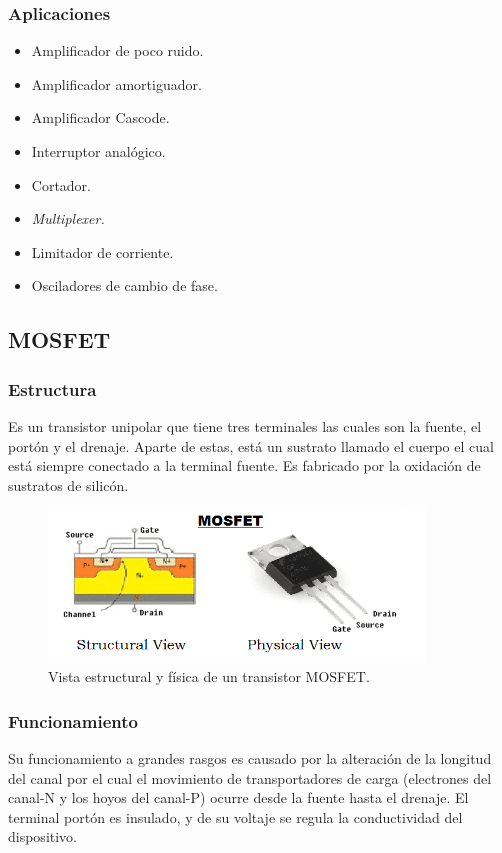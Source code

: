 \documentclass[letterpaper, 12pt]{article}
\begin{document}
\begin{justify}
        \subsubsection{Aplicaciones}
        \begin{itemize}
            \item Amplificador de poco ruido.
            \item Amplificador amortiguador.
            \item Amplificador Cascode.
            \item Interruptor analógico.
            \item Cortador.
            \item \emph{Multiplexer.}
            \item Limitador de corriente.
            \item Osciladores de cambio de fase.
        \end{itemize}
        \subsection{MOSFET}
        \subsubsection{Estructura}
        Es un transistor unipolar que tiene tres terminales las cuales son la fuente, el portón y el drenaje. Aparte de estas, está un sustrato llamado el cuerpo el cual está siempre
        conectado a la terminal fuente. Es fabricado por la oxidación de sustratos de silicón.
        \begin{figure}
            \centering
            \includegraphics[width=10cm]{MOSFET.png}
            \caption{Vista estructural y física de un transistor MOSFET.}
        \end{figure}
        \subsubsection{Funcionamiento}
        Su funcionamiento a grandes rasgos es causado por la alteración de la longitud del canal por el cual el movimiento de transportadores de carga (electrones del canal-N y los hoyos del canal-P) ocurre desde
        la fuente hasta el drenaje. El terminal portón es insulado, y de su voltaje se regula la conductividad del dispositivo.

\end{justify}
\end{document}
